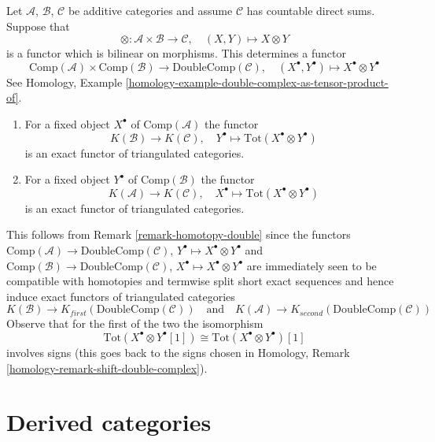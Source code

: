 \begin{remark}
\label{remark-double-complex-as-tensor-product-of}
Let $\mathcal{A}$, $\mathcal{B}$, $\mathcal{C}$ be additive categories
and assume $\mathcal{C}$ has countable direct sums. Suppose that
$$
\otimes : \mathcal{A} \times \mathcal{B} \longrightarrow \mathcal{C},
\quad
(X, Y) \longmapsto X \otimes Y
$$
is a functor which is bilinear on morphisms. This determines a functor
$$
\text{Comp}(\mathcal{A}) \times \text{Comp}(\mathcal{B})
\longrightarrow
\text{DoubleComp}(\mathcal{C}), \quad
(X^\bullet, Y^\bullet)
\longmapsto
X^\bullet \otimes Y^\bullet
$$
See
Homology, Example \ref{homology-example-double-complex-as-tensor-product-of}.
\begin{enumerate}
\item For a fixed object $X^\bullet$ of $\text{Comp}(\mathcal{A})$
the functor
$$
K(\mathcal{B}) \longrightarrow K(\mathcal{C}), \quad
Y^\bullet \longmapsto \text{Tot}(X^\bullet \otimes Y^\bullet)
$$
is an exact functor of triangulated categories.
\item For a fixed object $Y^\bullet$ of $\text{Comp}(\mathcal{B})$
the functor
$$
K(\mathcal{A}) \longrightarrow K(\mathcal{C}), \quad
X^\bullet \longmapsto \text{Tot}(X^\bullet \otimes Y^\bullet)
$$
is an exact functor of triangulated categories.
\end{enumerate}
This follows from Remark \ref{remark-homotopy-double} since
the functors
$\text{Comp}(\mathcal{A}) \to \text{DoubleComp}(\mathcal{C})$,
$Y^\bullet \mapsto X^\bullet \otimes Y^\bullet$ and
$\text{Comp}(\mathcal{B}) \to \text{DoubleComp}(\mathcal{C})$,
$X^\bullet \mapsto X^\bullet \otimes Y^\bullet$
are immediately seen to be compatible with homotopies
and termwise split short exact sequences and hence induce
exact functors of triangulated categories
$$
K(\mathcal{B}) \to K_{first}(\text{DoubleComp}(\mathcal{C}))
\quad\text{and}\quad
K(\mathcal{A}) \to K_{second}(\text{DoubleComp}(\mathcal{C}))
$$
Observe that for the first of the two the isomorphism
$$
\text{Tot}(X^\bullet \otimes Y^\bullet[1]) \cong
\text{Tot}(X^\bullet \otimes Y^\bullet)[1]
$$
involves signs (this goes back to the signs chosen in
Homology, Remark \ref{homology-remark-shift-double-complex}).
\end{remark}






\section{Derived categories}
\label{section-derived-categories}

